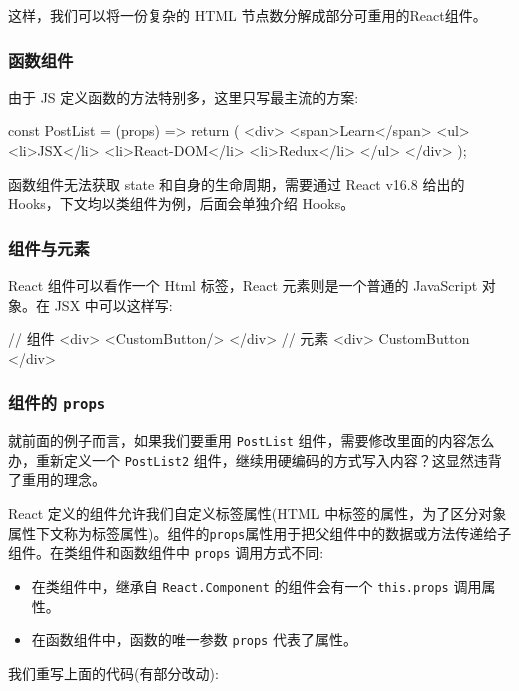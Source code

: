 这样，我们可以将一份复杂的 HTML 节点数分解成部分可重用的React组件。

\subsubsection*{函数组件}

由于 JS 定义函数的方法特别多，这里只写最主流的方案:

\begin{JavaScript}
const PostList = (props) => {
  return (
    <div>
      <span>Learn</span>
      <ul>
        <li>JSX</li>
        <li>React-DOM</li>
        <li>Redux</li>
      </ul>
    </div>
  );
}
\end{JavaScript}

函数组件无法获取 state 和自身的生命周期，需要通过 React v16.8 给出的 Hooks，下文均以类组件为例，后面会单独介绍 Hooks。

\subsubsection*{组件与元素}

React 组件可以看作一个 Html 标签，React 元素则是一个普通的 JavaScript 对象。在 JSX 中可以这样写:

\begin{JavaScript}
// 组件
<div>
  <CustomButton/>
</div>
// 元素
<div>
  {CustomButton}
</div>
\end{JavaScript}

\subsubsection{组件的 \texttt{props}}

就前面的例子而言，如果我们要重用 \texttt{PostList} 组件，需要修改里面的内容怎么办，重新定义一个 \texttt{PostList2} 组件，继续用硬编码的方式写入内容？这显然违背了重用的理念。

React 定义的组件允许我们自定义标签属性(HTML 中标签的属性，为了区分对象属性下文称为标签属性)。组件的\texttt{props}属性用于把父组件中的数据或方法传递给子组件。在类组件和函数组件中 \texttt{props} 调用方式不同:
\begin{itemize}
    \item 在类组件中，继承自 \texttt{React.Component} 的组件会有一个 \texttt{this.props} 调用属性。
    \item 在函数组件中，函数的唯一参数 \texttt{props} 代表了属性。
\end{itemize}

我们重写上面的代码(有部分改动):

